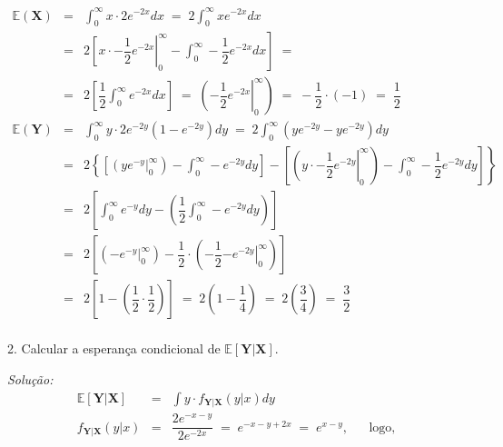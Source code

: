 \documentclass[a4paper, 11pt]{article}
\begin{document}
\begin{equation*}
\begin{array}{lclllll}
\mathds{E}(\mathbf{X}) & = & \displaystyle\int_{0}^{\infty} x \cdot 2 e^{-2x} dx \; = \; 2\displaystyle\int_{0}^{\infty} x e^{-2x} dx\\ 
& = & \left. 2\left[ x \cdot -\dfrac{1}{2}e^{-2x} \right\vert_{0}^{\infty} - \displaystyle\int_{0}^{\infty}-\dfrac{1}{2}e^{-2x}dx \right] \; = \;
\\
& = & 2\left[ \dfrac{1}{2} \displaystyle\int_{0}^{\infty}e^{-2x}dx \right] \; = \; \left.\left(-\dfrac{1}{2}e^{-2x} \right\vert_{0}^{\infty}\right) \; = \; -\dfrac{1}{2}\cdot (-1) \; = \; \dfrac{1}{2} \\[25pt]

\mathds{E}(\mathbf{Y}) & = & \displaystyle\int_{0}^{\infty} y \cdot 2 e^{-2y}(1-e^{-2y}) dy \; = \; 2\displaystyle\int_{0}^{\infty} \left(y e^{-2y} - y e^{-2y}\right) dy\\ 

& = & 2\left.\left\{\left[ \left( y e^{-y} \right\vert_{0}^{\infty}\right) - \displaystyle\int_{0}^{\infty}- e^{-2y}dy \right] - \left.\left[\left( y \cdot -\dfrac{1}{2}e^{-2y} \right\vert_{0}^{\infty}\right) - \displaystyle\int_{0}^{\infty} -\dfrac{1}{2}e^{-2y}dy \right]\right\} \\

& = & 2\left[ \displaystyle\int_{0}^{\infty} e^{-y}dy - \left( \dfrac{1}{2} \displaystyle\int_{0}^{\infty}- e^{-2y}dy\right) \right] \\

& = & 2\left[ \left( \left. -e^{-y} \right\vert_{0}^{\infty}\right) -  \dfrac{1}{2} \cdot\left( -\dfrac{1}{2} \left. -e^{-2y} \right\vert_{0}^{\infty}\right) \right] \\

& = & 2\left[ 1 -  \left( \dfrac{1}{2} \cdot\dfrac{1}{2} \right) \right] \; = \; 2\left(1 - \dfrac{1}{4} \right) \; = \; 2\left( \dfrac{3}{4} \right)\; = \; \dfrac{3}{2} \\

\end{array}
\end{equation*}

2. Calcular a esperança condicional de $\mathds{E}[\mathbf{Y}\vert\mathbf{X}]$.

\noindent
\textit{Solução:} \\
\begin{equation*}
\begin{array}{lclllll}
\mathds{E}[\mathbf{Y}\vert\mathbf{X}] & = & \displaystyle\int y \cdot f_{\mathbf{Y}|\mathbf{X}}(y|x) dy \\[25pt] 

f_{\mathbf{Y}|\mathbf{X}}(y|x) & = & \dfrac{2e^{-x-y}}{2e^{-2x}} \; = \; e^{-x-y+2x} \; = \; e^{x-y}, && \mbox{logo},\\[25pt] 

\end{array}
\end{equation*}
\end{document}
